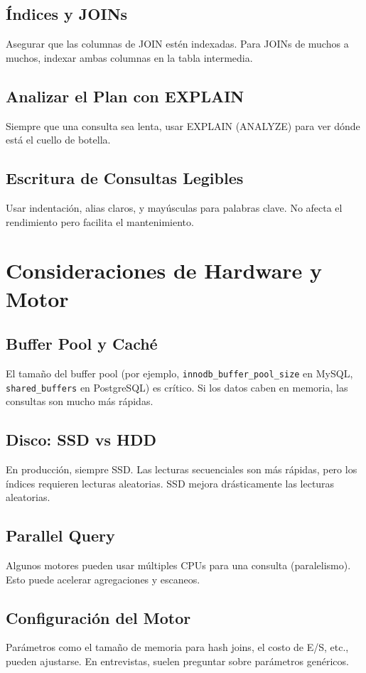 \documentclass[12pt,a4paper,openany,oneside]{book}
\begin{document}
\section{Índices y JOINs}
Asegurar que las columnas de JOIN estén indexadas. Para JOINs de muchos a muchos, indexar ambas columnas en la tabla intermedia.

\section{Analizar el Plan con EXPLAIN}
Siempre que una consulta sea lenta, usar EXPLAIN (ANALYZE) para ver dónde está el cuello de botella.

\section{Escritura de Consultas Legibles}
Usar indentación, alias claros, y mayúsculas para palabras clave. No afecta el rendimiento pero facilita el mantenimiento.

\chapter{Consideraciones de Hardware y Motor}
\section{Buffer Pool y Caché}
El tamaño del buffer pool (por ejemplo, \texttt{innodb\_buffer\_pool\_size} en MySQL, \texttt{shared\_buffers} en PostgreSQL) es crítico. Si los datos caben en memoria, las consultas son mucho más rápidas.

\section{Disco: SSD vs HDD}
En producción, siempre SSD. Las lecturas secuenciales son más rápidas, pero los índices requieren lecturas aleatorias. SSD mejora drásticamente las lecturas aleatorias.

\section{Parallel Query}
Algunos motores pueden usar múltiples CPUs para una consulta (paralelismo). Esto puede acelerar agregaciones y escaneos.

\section{Configuración del Motor}
Parámetros como el tamaño de memoria para hash joins, el costo de E/S, etc., pueden ajustarse. En entrevistas, suelen preguntar sobre parámetros genéricos.
\end{document}
